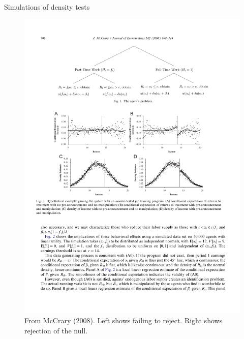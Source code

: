 \documentclass{beamer}
\begin{document}
\begin{frame}{Simulations of density tests}

	\begin{figure}
	\includegraphics[scale=0.75]{./lecture_includes/mccrary_density_test.pdf}
	\caption{\scriptsize From McCrary (2008). Left shows failing to reject.  Right shows rejection of the null.}
	\end{figure}

\end{frame}
\end{document}
